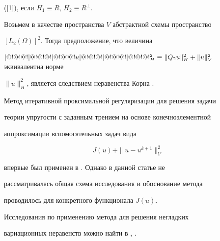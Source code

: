 \begin{examnonum}
(\ref{1}), если $H_1\equiv R$, $H_2\equiv R^\bot$.





Возьмем в качестве пространства $V$ абстрактной схемы пространство


$[L_2(\Omega)]^2$. Тогда предположение, что величина


$|@!@!@!|@!@!@!|@!@!@! u|@!@!@!|@!@!@!|@!@!@!^2_H\equiv\|Q_2u\|^2_H+\|u\|^2_V$ эквивалентна норме


$\|u\|^2_H$, является следствием неравенства Корна \cite{6}.





Метод итеративной проксимальной регуляризации для решения задачи


теории упругости с заданным трением на основе конечноэлементной


аппроксимации вспомогательных задач вида


$$


J(u)+\|u-u^{k+1}\|^2_V


$$


впервые был применен в \cite{7}. Однако в данной статье не


рассматривалась общая схема исследования и обоснование метода


проводилось для конкретного функционала $J(u)$. 


Исследования по применению метода для решения негладких


вариационных неравенств можно найти в \cite{8}, \cite{9}.


\end{examnonum}








